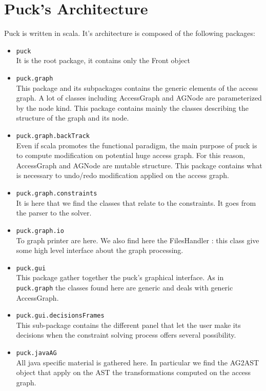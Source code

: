 \documentclass[]{article}
\begin{document}
\section{Puck's Architecture}
Puck is written in scala. It's architecture is composed of the following packages: 
\begin{itemize}
\item \verb|puck|\\
	It is the root package, it contains only the Front object

\item \verb|puck.graph|\\
	This package and its subpackages contains the generic elements of the access graph. A lot of classes including AccessGraph and AGNode are parameterized by the node kind. This package contains mainly the classes describing the structure of the graph and its node.

\item \verb|puck.graph.backTrack|\\
	Even if scala promotes the functional paradigm, the main purpose of puck is to compute modification on potential huge access graph. For this reason, AccessGraph and AGNode are mutable structure. This package contains what is necessary to undo/redo modification applied on the access graph.

\item \verb|puck.graph.constraints|\\
	It is here that we find the classes that relate to the constraints. It goes from the parser to the solver.

\item \verb|puck.graph.io|\\
	To graph printer are here. We also find here the FilesHandler : this class give some high level interface about the graph processing.

\item \verb|puck.gui|\\
	This package gather together the puck's graphical interface. As in \verb|puck.graph| the classes found here are generic and deals with generic AccessGraph.
	
\item \verb|puck.gui.decisionsFrames|\\
	This sub-package contains the different panel that let the user make its decisions when the constraint solving process offers several possibility.
	
\item \verb|puck.javaAG|\\
	All java specific material is gathered here. 
	In particular we find the AG2AST object that apply on the AST the transformations computed on the access graph.


\end{itemize}
\end{document}
